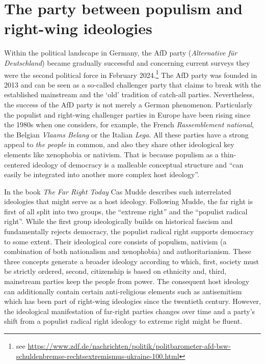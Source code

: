 \documentclass[a4paper]{scrreprt}
\begin{document}
\section{The party between populism and right-wing ideologies}
Within the political landscape in Germany, the AfD party ({\em Alternative für Deutschland}) became gradually successful and concerning current surveys they were the second political force in February 2024.\footnote{see \url{https://www.zdf.de/nachrichten/politik/politbarometer-afd-bsw-schuldenbremse-rechtsextremismus-ukraine-100.html}} The AfD party was founded in 2013 and can be seen as a so-called challenger party that claims to break with the established mainstream and the `old' tradition of catch-all parties. \citep{devries:2020} Nevertheless, the success of the AfD party is not merely a German phenomenon. Particularly the populist and right-wing challenger parties in Europe have been rising since the 1980s when one considers, for example, the French {\em Rassemblement national}, the Belgian {\em Vlaams Belang} or the Italian {\em Lega}. \cite[p.~30]{devries:2020} All these parties have a strong appeal to {\em the people} in common, and also they share other ideological key elements like xenophobia or nativism. That is because populism as a thin-centered ideology of democracy is a malleable conceptual structure and ``can easily be integrated into another more complex host ideology''. \cite[p.~19]{devries:2020}\par
In the book {\em The Far Right Today} Cas Mudde describes such interrelated ideologies that might serve as a host ideology. Following Mudde, the far right is first of all split into two groups, the ``extreme right'' and the ``populist radical right''. While the first group ideologically builds on historical fascism and fundamentally rejects democracy, the populist radical right supports democracy to some extent. Their ideological core consists of populism, nativism (a combination of both nationalism and xenophobia) and authoritarianism. \cite[p.~24]{mudde:2019} These three concepts generate a broader ideology according to which, first, society must be strictly ordered, second, citizenship is based on ethnicity and, third, mainstream parties keep the people from power. The consequent host ideology can additionally contain certain anti-religious elements such as antisemitism which has been part of right-wing ideologies since the twentieth century. \cite[p.~28]{mudde:2019} However, the ideological manifestation of far-right parties changes over time and a party's shift from a populist radical right ideology to extreme right might be fluent.\par
\end{document}
